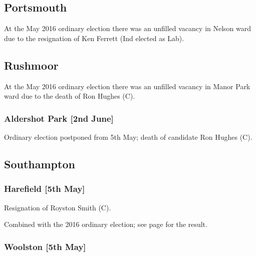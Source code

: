 \documentclass[a4paper,openany]{book}
\begin{document}
\begin{resultsiii}
\subsection*{Portsmouth}

At the May 2016 ordinary election there was an unfilled vacancy in Nelson ward due to the resignation of Ken Ferrett (Ind elected as Lab).

\subsection*{Rushmoor}

At the May 2016 ordinary election there was an unfilled vacancy in Manor Park ward due to the death of Ron Hughes (C).

\subsubsection*{Aldershot Park \hspace*{\fill}\nolinebreak[1]%
\enspace\hspace*{\fill}
[2nd June]}


Ordinary election postponed from 5th May; death of candidate Ron Hughes (C).

\subsection*{Southampton}

\subsubsection*{Harefield \hspace*{\fill}\nolinebreak[1]%
\enspace\hspace*{\fill}
[5th May]}


Resignation of Royston Smith (C).

Combined with the 2016 ordinary election; see page \pageref{HarefieldSouthampton} for the result.

\subsubsection*{Woolston \hspace*{\fill}\nolinebreak[1]%
\enspace\hspace*{\fill}
[5th May]}


\end{resultsiii}
\end{document}
